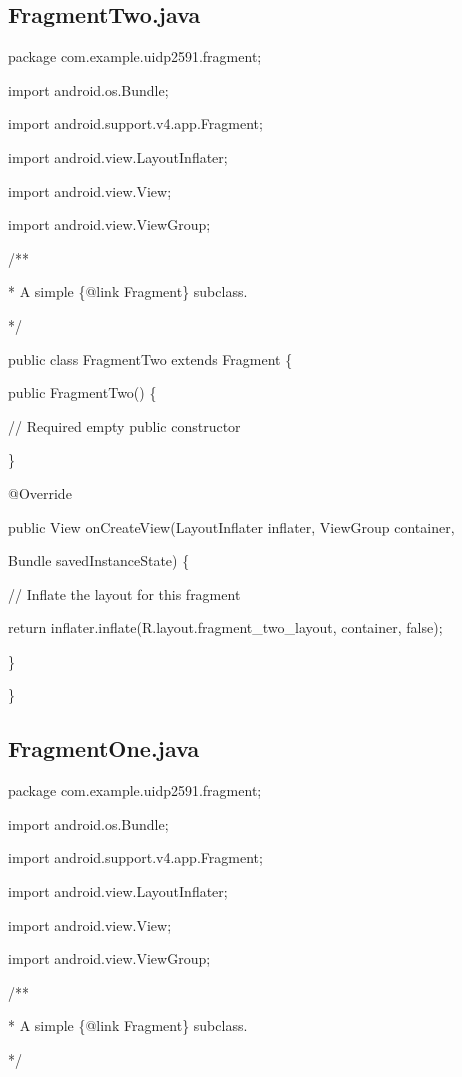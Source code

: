 \documentclass{article}
\begin{document}
\bigskip 

\subsection{\protect\bigskip FragmentTwo.java}

package com.example.uidp2591.fragment;

import android.os.Bundle;

import android.support.v4.app.Fragment;

import android.view.LayoutInflater;

import android.view.View;

import android.view.ViewGroup;

/**

* A simple \{@link Fragment\} subclass.

*/

public class FragmentTwo extends Fragment \{

public FragmentTwo() \{

// Required empty public constructor

\}

@Override

public View onCreateView(LayoutInflater inflater, ViewGroup container,

Bundle savedInstanceState) \{

// Inflate the layout for this fragment

return inflater.inflate(R.layout.fragment\_two\_layout, container, false);

\}

\}

\bigskip 

\subsection{FragmentOne.java}

package com.example.uidp2591.fragment;

import android.os.Bundle;

import android.support.v4.app.Fragment;

import android.view.LayoutInflater;

import android.view.View;

import android.view.ViewGroup;

/**

* A simple \{@link Fragment\} subclass.

*/
\end{document}
